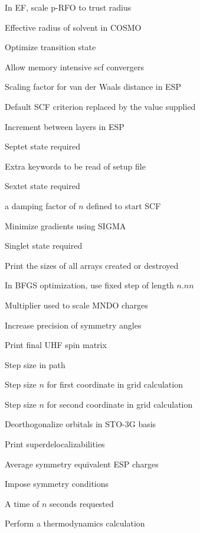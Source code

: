 \begin{description}
\item[] In EF, scale p-RFO to trust radius
\item[] Effective radius of solvent in COSMO
\item[] Optimize transition state
\item[] Allow memory intensive scf convergers
\item[] Scaling factor for van der Waals distance in ESP
\item[] Default SCF criterion replaced by the value supplied
\item[] Increment between layers in ESP
\item[] Septet state required
\item[] Extra keywords to be read of setup file
\item[] Sextet state required
\item[] a damping factor of $n$ defined to start SCF
\item[] Minimize gradients using SIGMA
\item[] Singlet state required
\item[] Print the sizes of all arrays created or destroyed
\item[] In BFGS optimization, use fixed step of length $n.nn$
\item[] Multiplier used to scale MNDO charges
\item[]Increase precision of symmetry angles
\item[] Print final UHF spin matrix
\item[] Step size in path
\item[] Step size $n$ for first coordinate in grid calculation
\item[] Step size $n$ for second coordinate in grid calculation
\item[] Deorthogonalize orbitals in STO-3G basis
\item[] Print superdelocalizabilities
\item[] Average symmetry equivalent ESP charges
\item[] Impose symmetry conditions
\item[] A time of $n$ seconds requested
\item[] Perform a thermodynamics calculation

\end{description}
